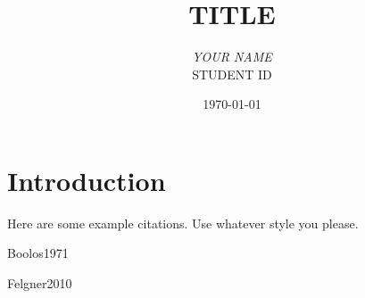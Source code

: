 \documentclass[12pt]{article}
\makeatletter
\DeclareRobustCommand\citepos%
  {\begingroup
   \let\NAT@nmfmt\NAT@posfmt%
   \NAT@swafalse\let\NAT@ctype\z@\NAT@partrue
   \@ifstar{\NAT@fulltrue\NAT@citetp}{\NAT@fullfalse\NAT@citetp}
  }
\let\NAT@orig@nmfmt\NAT@nmfmt %
\def\NAT@posfmt#1{%
  \StrRemoveBraces{#1}[\NAT@temp]%
  \IfEndWith{\NAT@temp}{s}
    {\NAT@orig@nmfmt{#1'}}
    {\NAT@orig@nmfmt{#1's}}}
\makeatother
\begin{document}
\title{\sc TITLE}
\author{\textit{YOUR NAME}\\ \small STUDENT ID} 
\date{\today}
\maketitle
\thispagestyle{empty}



\doublespacing

\section{Introduction}
  \label{Intro}

Here are some example citations. Use whatever style you please.

\cite{Russell1908}

\cite{Laan1996}

\citep{Weyl1946}

\citep{Ramsey2013}

\citepos{Boolos1971}

\citepos{Felgner2010}

\citet{Cartwright1994}

\citet{Williamson2003}

\cite{Mctaggart1908}

\cite{Shoemaker1969}









\newpage
\begin{footnotesize} %
\singlespacing %
\setlength{\bibsep}{5pt} %
\thispagestyle{empty} %
\end{footnotesize} %
\end{document}
